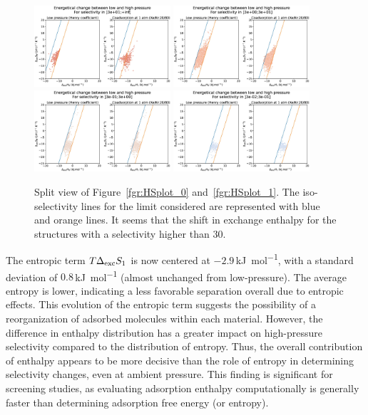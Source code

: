 \documentclass[main.tex]{subfiles}
\begin{document}
 
\begin{figure}[ht]
  \centering
    \includegraphics[width=0.45\textwidth]{figures/2-thermo/H_S_0.jpg}
    \includegraphics[width=0.45\textwidth]{figures/2-thermo/H_S_1.jpg}
    \includegraphics[width=0.45\textwidth]{figures/2-thermo/H_S_2.jpg}
    \includegraphics[width=0.45\textwidth]{figures/2-thermo/H_S_3.jpg}
    \caption{Split view of Figure~\ref{fgr:HSplot_0} and~\ref{fgr:HSplot_1}. The iso-selectivity lines for the limit considered are represented with blue and orange lines. It seems that the shift in exchange enthalpy for the structures with a selectivity higher than $30$.}\label{fgr:SI:HS_split}
\end{figure}

The entropic term $T\Delta_{\text{exc}}S_{\text{1}}$ is now centered at $-2.9$\,\si{\kilo\joule\per\mol}, with a standard deviation of $0.8$\,\si{\kilo\joule\per\mol} (almost unchanged from low-pressure). The average entropy is lower, indicating a less favorable separation overall due to entropic effects. This evolution of the entropic term suggests the possibility of a reorganization of adsorbed molecules within each material. However, the difference in enthalpy distribution has a greater impact on high-pressure selectivity compared to the distribution of entropy. Thus, the overall contribution of enthalpy appears to be more decisive than the role of entropy in determining selectivity changes, even at ambient pressure. This finding is significant for screening studies, as evaluating adsorption enthalpy computationally is generally faster than determining adsorption free energy (or entropy).
\end{document}
